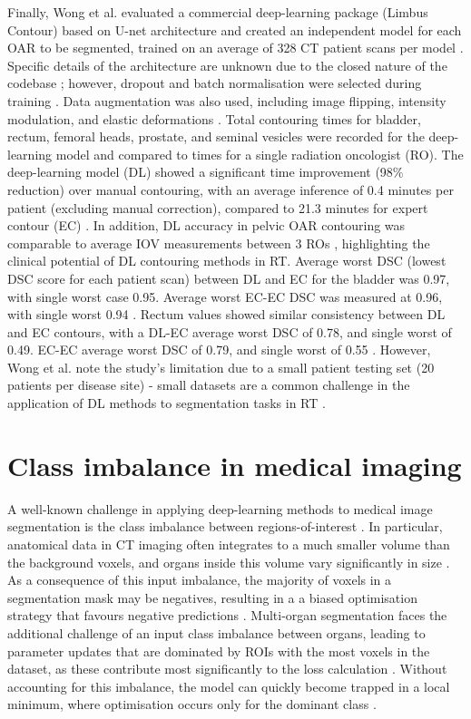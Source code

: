 Finally, Wong et al. evaluated a commercial deep-learning package (Limbus Contour) based on U-net architecture and created an independent model for each OAR to be segmented, trained on an average of 328 CT patient scans per model \cite{Wong2020}. Specific details of the architecture are unknown due to the closed nature of the codebase \cite{Wong2020}; however, dropout and batch normalisation were selected during training \cite{Wong2020}. Data augmentation was also used, including image flipping, intensity modulation, and elastic deformations \cite{Wong2020}. Total contouring times for bladder, rectum, femoral heads, prostate, and seminal vesicles were recorded for the deep-learning model and compared to times for a single radiation oncologist (RO). The deep-learning model (DL) showed a significant time improvement (98\% reduction) over manual contouring, with an average inference of 0.4 minutes per patient (excluding manual correction), compared to 21.3 minutes for expert contour (EC) \cite{Wong2020}. In addition, DL accuracy in pelvic OAR contouring was comparable to average IOV measurements between 3 ROs \cite{Wong2020}, highlighting the clinical potential of DL contouring methods in RT. Average worst DSC (lowest DSC score for each patient scan) between DL and EC for the bladder was 0.97, with single worst case 0.95. Average worst EC-EC DSC was measured at 0.96, with single worst 0.94 \cite{Wong2020}. Rectum values showed similar consistency between DL and EC contours, with a DL-EC average worst DSC of 0.78, and single worst of 0.49. EC-EC average worst DSC of 0.79, and single worst of 0.55 \cite{Wong2020}. However, Wong et al. note the study's limitation due to a small patient testing set (20 patients per disease site) \cite{Wong2020} - small datasets are a common challenge in the application of DL methods to segmentation tasks in RT \cite{Ronneberger_2015, Maier2019, Hesamian2019, Lundervold2019}.
%

%
%
\section{Class imbalance in medical imaging}
A well-known challenge in applying deep-learning methods to medical image segmentation is the class imbalance between regions-of-interest \cite{Hesamian2019}. In particular, anatomical data in CT imaging often integrates to a much smaller volume than the background voxels, and organs inside this volume vary significantly in size \cite{taghanaki2018}. As a consequence of this input imbalance, the majority of voxels in a segmentation mask may be negatives, resulting in a a biased optimisation strategy that favours negative predictions \cite{taghanaki2018}. Multi-organ segmentation faces the additional challenge of an input class imbalance between organs, leading to parameter updates that are dominated by ROIs with the most voxels in the dataset, as these contribute most significantly to the loss calculation \cite{Khan2019}. Without accounting for this imbalance, the model can quickly become trapped in a local minimum, where optimisation occurs only for the dominant class \cite{Khan2019}. 

